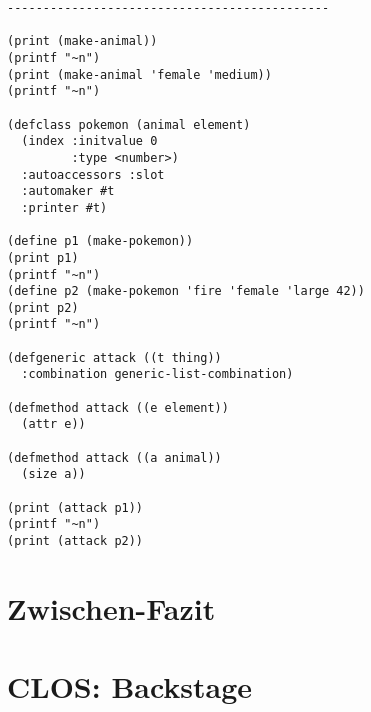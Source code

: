 \begin{lstlisting}
---------------------------------------------

(print (make-animal))
(printf "~n")
(print (make-animal 'female 'medium))
(printf "~n")

(defclass pokemon (animal element)
  (index :initvalue 0
         :type <number>)
  :autoaccessors :slot
  :automaker #t
  :printer #t)

(define p1 (make-pokemon))
(print p1)
(printf "~n")
(define p2 (make-pokemon 'fire 'female 'large 42))
(print p2)
(printf "~n")

(defgeneric attack ((t thing))
  :combination generic-list-combination)

(defmethod attack ((e element))
  (attr e))

(defmethod attack ((a animal))
  (size a))

(print (attack p1))
(printf "~n")
(print (attack p2))
\end{lstlisting}

\section{Zwischen-Fazit}

\section{CLOS: Backstage}

% 






